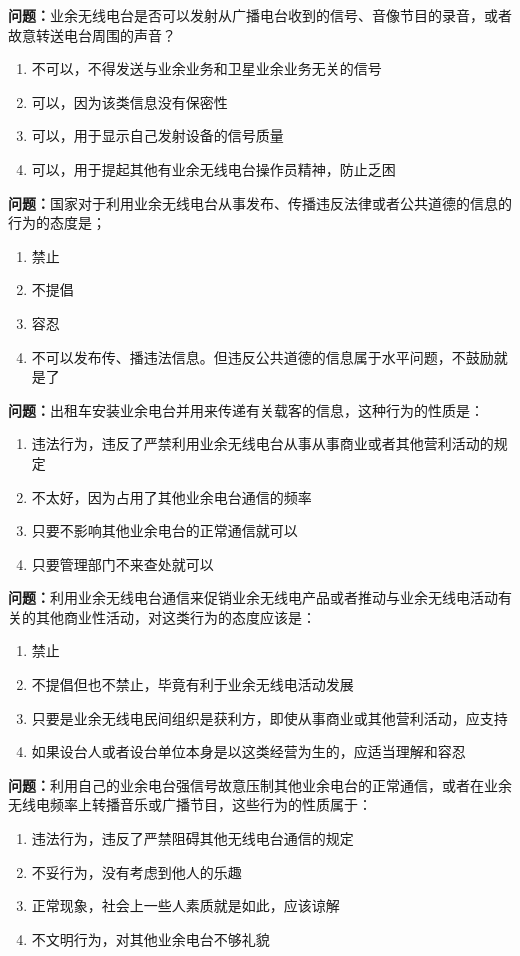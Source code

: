 \documentclass{ctexbook}
\begin{document}
\textbf{问题：}业余无线电台是否可以发射从广播电台收到的信号、音像节目的录音，或者故意转送电台周围的声音？
\begin{enumerate}[label=\Alph*), leftmargin=3em]
\item 不可以，不得发送与业余业务和卫星业余业务无关的信号
\item 可以，因为该类信息没有保密性
\item 可以，用于显示自己发射设备的信号质量
\item 可以，用于提起其他有业余无线电台操作员精神，防止乏困
\end{enumerate}

\textbf{问题：}国家对于利用业余无线电台从事发布、传播违反法律或者公共道德的信息的行为的态度是；
\begin{enumerate}[label=\Alph*), leftmargin=3em]
\item 禁止
\item 不提倡
\item 容忍
\item 不可以发布传、播违法信息。但违反公共道德的信息属于水平问题，不鼓励就是了
\end{enumerate}

\textbf{问题：}出租车安装业余电台并用来传递有关载客的信息，这种行为的性质是：
\begin{enumerate}[label=\Alph*), leftmargin=3em]
\item 违法行为，违反了严禁利用业余无线电台从事从事商业或者其他营利活动的规定
\item 不太好，因为占用了其他业余电台通信的频率
\item 只要不影响其他业余电台的正常通信就可以
\item 只要管理部门不来查处就可以
\end{enumerate}

\textbf{问题：}利用业余无线电台通信来促销业余无线电产品或者推动与业余无线电活动有关的其他商业性活动，对这类行为的态度应该是：
\begin{enumerate}[label=\Alph*), leftmargin=3em]
\item 禁止
\item 不提倡但也不禁止，毕竟有利于业余无线电活动发展
\item 只要是业余无线电民间组织是获利方，即使从事商业或其他营利活动，应支持
\item 如果设台人或者设台单位本身是以这类经营为生的，应适当理解和容忍
\end{enumerate}

\textbf{问题：}利用自己的业余电台强信号故意压制其他业余电台的正常通信，或者在业余无线电频率上转播音乐或广播节目，这些行为的性质属于：
\begin{enumerate}[label=\Alph*), leftmargin=3em]
\item 违法行为，违反了严禁阻碍其他无线电台通信的规定
\item 不妥行为，没有考虑到他人的乐趣
\item 正常现象，社会上一些人素质就是如此，应该谅解
\item 不文明行为，对其他业余电台不够礼貌
\end{enumerate}
\end{document}

